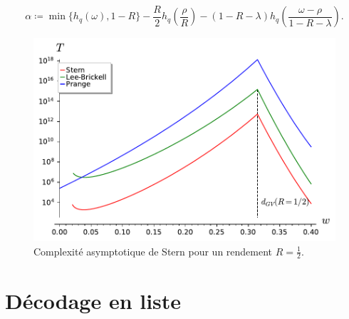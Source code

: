 \documentclass{scrartcl}[a4paper,9pt,headings=small,footinclude=false]
\theoremstyle{definition}
\theoremstyle{remark}
\begin{document}
\[
	\alpha \coloneq \min\{ h_q(\omega), 1-R \} -\frac{R}{2} h_q(\frac{\rho}{R}) - (1-R-\lambda)h_q(\frac{\omega - \rho}{1 - R - \lambda}).
\]

\begin{figure}[h!]
\centering
\includegraphics{decodage_syndrome/Stern.pdf}
\caption{Complexité asymptotique de Stern pour un rendement $R=\frac{1}{2}$.}
\label{fig:prange}
\end{figure}

\newpage
\section{Décodage en liste}
\end{document}
